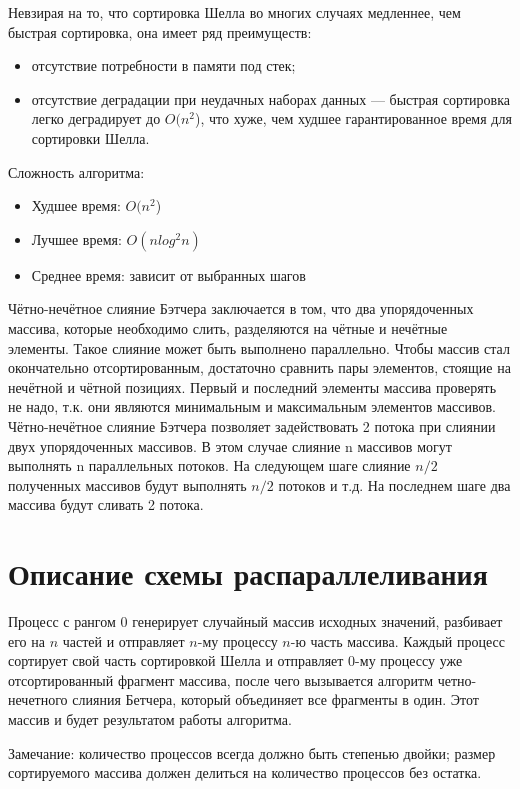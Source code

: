 \documentclass{report}
\begin{document}
Невзирая на то, что сортировка Шелла во многих случаях медленнее, чем быстрая сортировка, она имеет ряд преимуществ:
\begin{itemize}
    \item отсутствие потребности в памяти под стек;
    \item отсутствие деградации при неудачных наборах данных — быстрая сортировка легко деградирует до $O(n^2$), что хуже, чем худшее гарантированное время для сортировки Шелла.
\end{itemize}
Сложность алгоритма:
\begin{itemize}
    \item Худшее время: $O(n^2$)
    \item Лучшее время: $O(nlog^2n)$
    \item Среднее время: зависит от выбранных шагов
\end{itemize}
\par Чётно-нечётное слияние Бэтчера заключается в том, что два упорядоченных массива, которые необходимо слить, разделяются на чётные и нечётные элементы. Такое слияние может быть выполнено параллельно.
Чтобы массив стал окончательно отсортированным, достаточно сравнить
пары элементов, стоящие на нечётной и чётной позициях. Первый и последний элементы массива проверять не надо, т.к. они являются минимальным и максимальным элементов массивов.
Чётно-нечётное слияние Бэтчера позволяет задействовать 2 потока при
слиянии двух упорядоченных массивов. В этом случае слияние n массивов
могут выполнять n параллельных потоков. На следующем шаге слияние $n/2$
полученных массивов будут выполнять $n/2$ потоков и т.д. На последнем
шаге два массива будут сливать 2 потока.
\newpage
\section*{Описание схемы распараллеливания}
\par Процесс с рангом 0 генерирует случайный массив исходных значений, разбивает его на $n$ частей и отправляет $n$-му процессу $n$-ю часть массива. Каждый процесс сортирует свой часть сортировкой Шелла и отправляет $0$-му процессу уже отсортированный фрагмент массива, после чего вызывается алгоритм четно-нечетного слияния Бетчера, который объединяет все фрагменты в один. Этот массив и будет результатом работы алгоритма.
\par Замечание: количество процессов всегда должно быть степенью двойки; размер сортируемого массива должен делиться на количество процессов без остатка.
\end{document}
